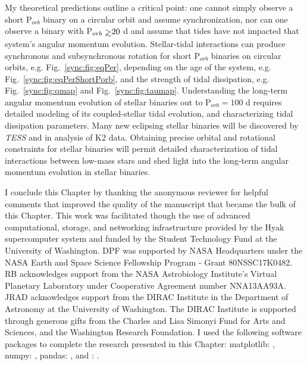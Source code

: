 My theoretical predictions outline a critical point: one cannot simply observe a short P$_{orb}$ binary on a circular orbit and assume synchronization, nor can one observe a binary with P$_{orb} \gsim 20$ d and assume that tides have not impacted that system's angular momentum evolution.  Stellar-tidal interactions can produce synchronous and subsynchronous rotation for short P$_{orb}$ binaries on circular orbits, e.g. Fig.~\ref{sync:fig:eqPer}, depending on the age of the system, e.g. Fig.~\ref{sync:fig:eqPerShortPorb}, and the strength of tidal dissipation, e.g. Fig.~\ref{sync:fig:qmap} and Fig.~\ref{sync:fig:taumap}.  Understanding the long-term angular momentum evolution of stellar binaries out to P$_{orb} = 100$ d requires detailed modeling of its coupled-stellar tidal evolution, and characterizing tidal dissipation parameters. Many new eclipsing stellar binaries will be discovered by \textit{TESS} \citep[e.g.][]{Sullivan2015,Matson2018} and in analysis of K2 data.  Obtaining precise orbital and rotational constraints for stellar binaries will permit detailed characterization of tidal interactions between low-mass stars and shed light into the long-term angular momentum evolution in stellar binaries. 

I conclude this Chapter by thanking the anonymous reviewer for helpful comments that improved the quality of the manuscript that became the bulk of this Chapter. This work was facilitated though the use of advanced computational, storage, and networking infrastructure provided by the Hyak supercomputer system and funded by the Student Technology Fund at the University of Washington. DPF was supported by NASA Headquarters under the NASA Earth and Space Science Fellowship Program - Grant 80NSSC17K0482.  RB acknowledges support from the NASA Astrobiology Institute's Virtual Planetary Laboratory under Cooperative Agreement number NNA13AA93A. JRAD acknowledges support from the DIRAC Institute in the Department of Astronomy at the University of Washington. The DIRAC Institute is supported through generous gifts from the Charles and Lisa Simonyi Fund for Arts and Sciences, and the Washington Research Foundation. I used the following software packages to complete the research presented in this Chapter: matplotlib: \citet{Hunter2007}, numpy: \citet{vanderWalt2011}, pandas: \citet{Mckinney2010}, and \vplanet: \citet{Barnes2019}.

